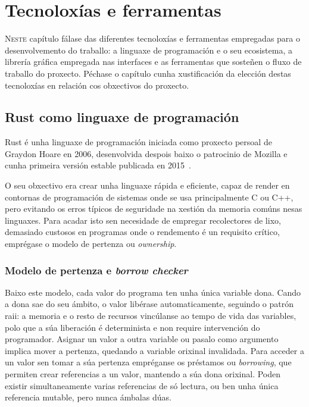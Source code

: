 \chapter{Tecnoloxías e ferramentas}
\label{chap:ferramentas}

\lettrine{N}{este} capítulo fálase das diferentes tecnoloxías e ferramentas empregadas para o desenvolvemento do traballo:
a linguaxe de programación e o seu ecosistema, a librería gráfica empregada nas interfaces
e as ferramentas que sosteñen o fluxo de traballo do proxecto.
Péchase o capítulo cunha xustificación da elección destas tecnoloxías
en relación cos obxectivos do proxecto.

\section{Rust como linguaxe de programación}
Rust é unha linguaxe de programación iniciada como proxecto persoal de Graydon Hoare en 2006,
desenvolvida despois baixo o patrocinio de Mozilla e cunha primeira versión estable publicada en 2015~\cite{Rust}.

O seu obxectivo era crear unha linguaxe rápida e eficiente,
capaz de render en contornas de programación de sistemas onde se usa principalmente C ou C++,
pero evitando os erros típicos de seguridade na xestión da memoria comúns nesas linguaxes.
Para acadar isto sen necesidade de empregar recolectores de lixo,
demasiado custosos en programas onde o rendemento é un requisito crítico,
emprégase o modelo de pertenza ou \textit{ownership}.

\subsection{Modelo de pertenza e \textit{borrow checker}}
Baixo este modelo, cada valor do programa ten unha única variable dona.
Cando a dona sae do seu ámbito, o valor libérase automaticamente,
seguindo o patrón \acrfull{raii}:
a memoria e o resto de recursos vincúlanse ao tempo de vida das variables,
polo que a súa liberación é determinista e non require intervención do programador.
Asignar un valor a outra variable ou pasalo como argumento implica mover a pertenza,
quedando a variable orixinal invalidada.
Para acceder a un valor sen tomar a súa pertenza empréganse os préstamos ou \textit{borrowing},
que permiten crear referencias a un valor, mantendo a súa dona orixinal.
Poden existir simultaneamente varias referencias de só lectura, ou ben unha única referencia mutable,
pero nunca ámbalas dúas.

